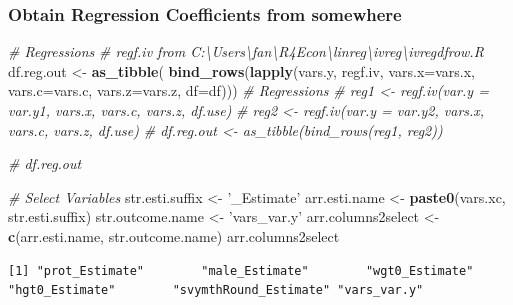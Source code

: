 \documentclass[
]{book}
\newenvironment{Shaded}{\begin{snugshade}}{\end{snugshade}}
\newcommand{\CommentTok}[1]{\textcolor[rgb]{0.56,0.35,0.01}{\textit{#1}}}
\newcommand{\DataTypeTok}[1]{\textcolor[rgb]{0.13,0.29,0.53}{#1}}
\newcommand{\KeywordTok}[1]{\textcolor[rgb]{0.13,0.29,0.53}{\textbf{#1}}}
\newcommand{\NormalTok}[1]{#1}
\newcommand{\StringTok}[1]{\textcolor[rgb]{0.31,0.60,0.02}{#1}}
\begin{document}
\hypertarget{obtain-regression-coefficients-from-somewhere}{%
\subsubsection{Obtain Regression Coefficients from somewhere}\label{obtain-regression-coefficients-from-somewhere}}

\begin{Shaded}
\begin{Highlighting}[]
\CommentTok{# Regressions}
\CommentTok{# regf.iv from C:\textbackslash{}Users\textbackslash{}fan\textbackslash{}R4Econ\textbackslash{}linreg\textbackslash{}ivreg\textbackslash{}ivregdfrow.R}
\NormalTok{df.reg.out <-}\StringTok{ }\KeywordTok{as_tibble}\NormalTok{(}
  \KeywordTok{bind_rows}\NormalTok{(}\KeywordTok{lapply}\NormalTok{(vars.y, regf.iv,}
                   \DataTypeTok{vars.x=}\NormalTok{vars.x, }\DataTypeTok{vars.c=}\NormalTok{vars.c, }\DataTypeTok{vars.z=}\NormalTok{vars.z, }\DataTypeTok{df=}\NormalTok{df)))}
\CommentTok{# Regressions}
\CommentTok{# reg1 <- regf.iv(var.y = var.y1, vars.x, vars.c, vars.z, df.use)}
\CommentTok{# reg2 <- regf.iv(var.y = var.y2, vars.x, vars.c, vars.z, df.use)}
\CommentTok{# df.reg.out <- as_tibble(bind_rows(reg1, reg2))}
\end{Highlighting}
\end{Shaded}

\begin{Shaded}
\begin{Highlighting}[]
\CommentTok{# df.reg.out}
\end{Highlighting}
\end{Shaded}

\begin{Shaded}
\begin{Highlighting}[]
\CommentTok{# Select Variables}
\NormalTok{str.esti.suffix <-}\StringTok{ '_Estimate'}
\NormalTok{arr.esti.name <-}\StringTok{ }\KeywordTok{paste0}\NormalTok{(vars.xc, str.esti.suffix)}
\NormalTok{str.outcome.name <-}\StringTok{ 'vars_var.y'}
\NormalTok{arr.columns2select <-}\StringTok{ }\KeywordTok{c}\NormalTok{(arr.esti.name, str.outcome.name)}
\NormalTok{arr.columns2select}
\end{Highlighting}
\end{Shaded}

\begin{verbatim}
[1] "prot_Estimate"        "male_Estimate"        "wgt0_Estimate"        "hgt0_Estimate"        "svymthRound_Estimate" "vars_var.y"          
\end{verbatim}
\end{document}
